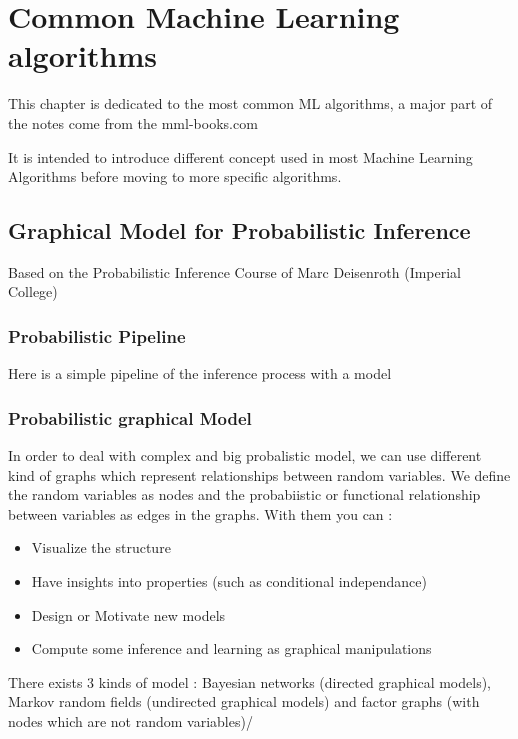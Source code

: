\chapter{Common Machine Learning algorithms}\label{ch:introduction}

This chapter is dedicated to the most common ML algorithms, a major part of the notes come from the mml-books.com 

It is intended to introduce different concept used in most Machine Learning Algorithms before moving to more specific algorithms.


\section{Graphical Model for Probabilistic Inference}

Based on the Probabilistic Inference Course of Marc Deisenroth (Imperial College)

	\subsection{Probabilistic Pipeline}

	Here is a simple pipeline of the inference process with a model


	\subsection{Probabilistic graphical Model}

		In order to deal with complex and big probalistic model, we can use different kind of graphs which represent relationships between random variables. We define the random variables as nodes and the probabiistic or functional relationship between variables as edges in the graphs. With them you can :
		\begin{itemize}
			\item Visualize the structure
			\item Have insights into properties (such as conditional independance)
			\item Design or Motivate new models
			\item Compute some inference and learning as graphical manipulations
		\end{itemize}

		There exists 3 kinds of model : Bayesian networks (directed graphical models), Markov random fields (undirected graphical models) and factor graphs (with nodes which are not random variables)/

